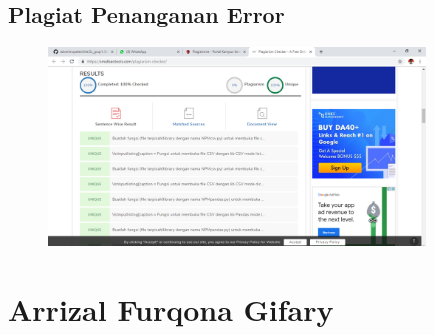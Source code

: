 \subsection{Plagiat Penanganan Error}
\begin{figure}[H]
	\includegraphics[width=10cm]{figures/4/1174089/Praktek/plagiatpenanganan.png}
	\centering
\end{figure}
\section{Arrizal Furqona Gifary}
